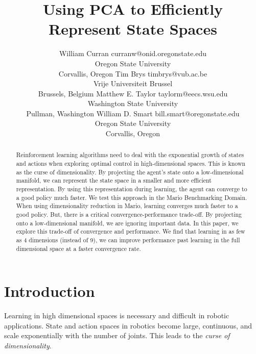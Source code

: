 \documentclass[twoside,11pt]{article}
\begin{document}
\title{Using PCA to Efficiently Represent State Spaces}

\author{\name William Curran \email curranw@onid.oregonstate.edu\\ 
\addr Oregon State University\\ 
Corvallis, Oregon
\AND
\name Tim Brys \email timbrys@vub.ac.be \\
\addr Vrije Universiteit Brussel \\
\addr Brussels, Belgium
\AND
\name Matthew E. Taylor \email taylorm@eecs.wsu.edu \\
\addr Washington State University \\
\addr Pullman, Washington
\AND
\name William D. Smart \email bill.smart@oregonstate.edu\\
\addr Oregon State University\\ 
Corvallis, Oregon
}



\maketitle

\begin{abstract}

Reinforcement learning algorithms need to deal with the exponential growth of states and actions when exploring optimal control in high-dimensional spaces. This is known as the curse of dimensionality. By projecting the agent's state onto a low-dimensional manifold, we can represent the state space in a smaller and more efficient representation. By using this representation during learning, the agent can converge to a good policy much faster. We test this approach in the Mario Benchmarking Domain. When using dimensionality reduction in Mario, learning converges much faster to a good policy. But, there is a critical convergence-performance trade-off. By projecting onto a low-dimensional manifold, we are ignoring important data. In this paper, we explore this trade-off of convergence and performance. We find that learning in as few as 4 dimensions (instead of 9), we can improve performance past learning in the full dimensional space at a faster convergence rate.
\end{abstract}


\section{Introduction}

Learning in high dimensional spaces is necessary and difficult in robotic applications. State and action spaces in robotics become large, continuous, and scale exponentially with the number of joints. This leads to the \textit{curse of dimensionality}.  
\end{document}
